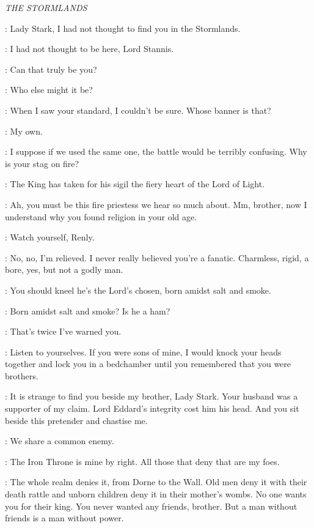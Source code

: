 

\scene

\textit{THE STORMLANDS} 


\STANNIS: Lady Stark, I had not thought to find you in the Stormlands. 

\CATELYN: I had not thought to be here, Lord Stannis. 

\RENLY:  Can that truly be you? 

\STANNIS: Who else might it be? 

\RENLY: When I saw your standard, I couldn't be sure. Whose banner is that? 

\STANNIS: My own. 

\RENLY: I suppose if we used the same one, the battle would be terribly confusing. Why is your stag on fire? 

\MELISANDRE: The King has taken for his sigil the fiery heart of the Lord of Light. 

\RENLY: Ah, you must be this fire priestess we hear so much about. Mm, brother, now I understand why you found religion in your old age. 

\STANNIS: Watch yourself, Renly. 

\RENLY: No, no, I'm relieved. I never really believed you're a fanatic. Charmless, rigid, a bore, yes, but not a godly man. 

\MELISANDRE: You should kneel he's the Lord's chosen, born amidst salt and smoke. 

\RENLY: Born amidst salt and smoke? Is he a ham? 

\STANNIS: That's twice I've warned you. 

\CATELYN: Listen to yourselves. If you were sons of mine, I would knock your heads together and lock you in a bedchamber until you remembered that you were brothers. 

\STANNIS: It is strange to find you beside my brother, Lady Stark. Your husband was a supporter of my claim. Lord Eddard's integrity cost him his head. And you sit beside this pretender and chastise me. 

\CATELYN: We share a common enemy. 

\STANNIS: The Iron Throne is mine by right. All those that deny that are my foes. 

\RENLY: The whole realm denies it, from Dorne to the Wall. Old men deny it with their death rattle and unborn children deny it in their mother's wombs. No one wants you for their king. You never wanted any friends, brother. But a man without friends is a man without power. 

